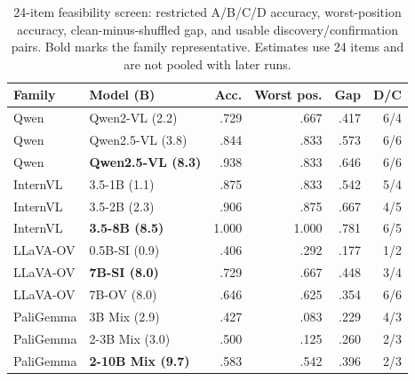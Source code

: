 \documentclass[11pt]{article}
\begin{document}
\begin{table}[h]
\centering
\scriptsize
\setlength{\tabcolsep}{2.5pt}
\begin{tabular}{@{}llrrrr@{}}
\toprule
Family & Model (B) & Acc. & Worst pos. & Gap & D/C \\
\midrule
Qwen & Qwen2-VL (2.2) & .729 & .667 & .417 & 6/4 \\
Qwen & Qwen2.5-VL (3.8) & .844 & .833 & .573 & 6/6 \\
Qwen & \textbf{Qwen2.5-VL (8.3)} & .938 & .833 & .646 & 6/6 \\
InternVL & 3.5-1B (1.1) & .875 & .833 & .542 & 5/4 \\
InternVL & 3.5-2B (2.3) & .906 & .875 & .667 & 4/5 \\
InternVL & \textbf{3.5-8B (8.5)} & 1.000 & 1.000 & .781 & 6/5 \\
LLaVA-OV & 0.5B-SI (0.9) & .406 & .292 & .177 & 1/2 \\
LLaVA-OV & \textbf{7B-SI (8.0)} & .729 & .667 & .448 & 3/4 \\
LLaVA-OV & 7B-OV (8.0) & .646 & .625 & .354 & 6/6 \\
PaliGemma & 3B Mix (2.9) & .427 & .083 & .229 & 4/3 \\
PaliGemma & 2-3B Mix (3.0) & .500 & .125 & .260 & 2/3 \\
PaliGemma & \textbf{2-10B Mix (9.7)} & .583 & .542 & .396 & 2/3 \\
\bottomrule
\end{tabular}
\caption{24-item feasibility screen: restricted A/B/C/D accuracy, worst-position accuracy, clean-minus-shuffled gap, and usable discovery/confirmation pairs. Bold marks the family representative. Estimates use 24 items and are not pooled with later runs.}
\end{table}
\end{document}
